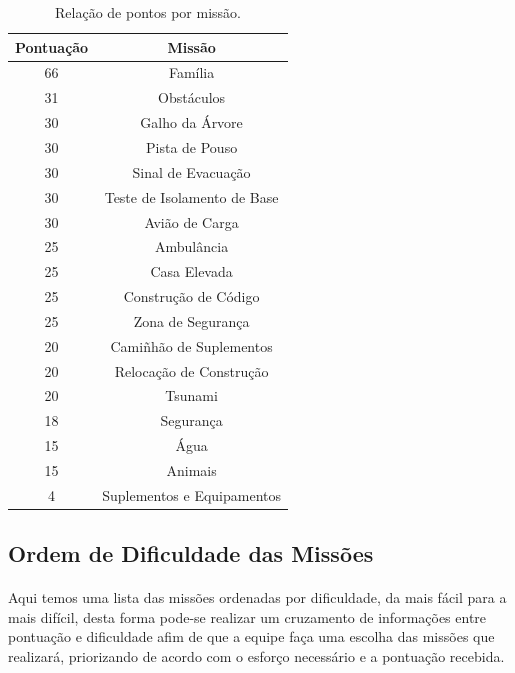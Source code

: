 \documentclass{article}
\begin{document}
		\begin{table}[h!]
			\begin{center}
				\begin{tabular}{cc}
					\toprule
						Pontuação & Missão\\
					\midrule
						66 & Família\\
						31 & Obstáculos\\
						30 & Galho da Árvore\\
						30 & Pista de Pouso\\
						30 & Sinal de Evacuação\\
						30 & Teste de Isolamento de Base\\
						30 & Avião de Carga\\
						25 & Ambulância\\
						25 & Casa Elevada\\
						25 & Construção de Código\\
						25 & Zona de Segurança\\
						20 & Camiñhão de Suplementos\\
						20 & Relocação de Construção\\
						20 & Tsunami\\
						18 & Segurança\\
						15 & Água\\
						15 & Animais\\
						4 & Suplementos e Equipamentos\\
					\bottomrule
				\end{tabular}
				\caption{Relação de pontos por missão.}
				\label{tab:table_pontuation}
			\end{center}
		\end{table}

	\subsection{Ordem de Dificuldade das Missões}
		\paragraph{}
			Aqui temos uma lista das missões ordenadas por dificuldade, da mais fácil para a mais difícil, desta forma pode-se realizar um cruzamento de informações entre pontuação e dificuldade afim de que a equipe faça uma escolha das missões que realizará, priorizando de acordo com o esforço necessário e a pontuação recebida.
\end{document}

